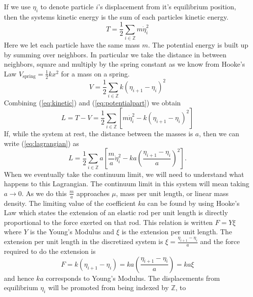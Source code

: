 If we use \(\eta_i\) to denote particle \(i\)'s displacement from it's
equilibrium position, then the systems kinetic energy is the sum of each
particles kinetic energy.
\begin{equation}\label{eq:kinetic}
    T = \frac{1}{2}\sum_{i\in\mathbb{Z}}m\dot{\eta}_i^2
\end{equation}
Here we let each particle have the same mass \(m\). The potential energy is
built up by summing over neighbors. In particular we take the distance in
between neighbors, square and multiply by the spring constant as we know from
Hooke's Law \(V_\text{spring} = \frac{1}{2}k x^2\) for a mass on a spring.
\begin{equation}\label{eq:potentialpart}
    V = \frac{1}{2}\sum_{i\in\mathbb{Z}}k\left(\eta_{i + 1} - \eta_i\right)^2
\end{equation}
Combining (\ref{eq:kinetic}) and (\ref{eq:potentialpart}) we obtain
\begin{equation}\label{eq:lagrangian}
    L = T - V = \frac{1}{2}\sum_{i\in\mathbb{Z}}\left[m\dot{\eta}_i^2 - k\left(\eta_{i + 1} - \eta_i\right)^2\right]
\end{equation}
If, while the system at rest, the distance between the masses is \(a\), then we
can write (\ref{eq:lagrangian}) as
\begin{equation}\label{eq:lagrangianMod}
    L = \frac{1}{2}\sum_{i\in\mathbb{Z}}a\left[\frac{m}{a}\dot{\eta}_i^2 - ka\left(\frac{\eta_{i + 1} - \eta_i}{a}\right)^2\right].
\end{equation}
When we eventually take the continuum limit, we will need to understand what
happens to this Lagrangian. The continuum limit in this system will mean taking
\(a\to 0\). As we do this \(\frac{m}{a}\) approaches \(\mu\), mass per unit
length, or linear mass density. The limiting value of the coefficient \(ka\) can
be found by using Hooke's Law which states the extension of an elastic rod per
unit length is directly proportional to the force exerted on that rod. This
relation is written \(F = Y\xi\) where \(Y\) is the Young's Modulus and \(\xi\)
is the extension per unit length. The extension per unit length in the
discretized system is \(\xi = \frac{\eta_{i + 1} - \eta_i}{a}\) and the force
required to do the extension is
\begin{equation}\label{eq:youngsMod}
    F = k(\eta_{i + 1} - \eta_i) = ka\left(\frac{\eta_{i + 1} - \eta_i}{a}\right) = ka\xi
\end{equation}
and hence \(ka\) corresponds to Young's Modulus. The displacements from
equilibrium \(\eta_i\) will be promoted from being indexed by \(\mathbb{Z}\), to
